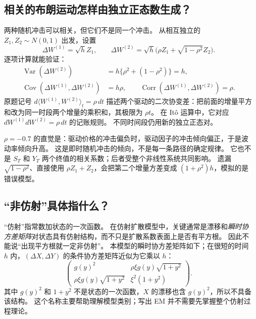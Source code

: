 \documentclass[11pt,a4paper,fontset=none]{ctexart}
\numberwithin{equation}{section}
\DeclareMathOperator{\Var}{Var}
\DeclareMathOperator{\Cov}{Cov}
\begin{document}
\subsection{相关的布朗运动怎样由独立正态数生成？}
两种随机冲击可以相关，但它们不是同一个冲击。
从相互独立的 $Z_1,Z_2\sim N(0,1)$ 出发，设置
\begin{equation}\label{eq:na-correlated}
 \Delta W^{(1)}=\sqrt h Z_1,\qquad
 \Delta W^{(2)}=\sqrt h\bigl(\rho Z_1+\sqrt{1-\rho^2}Z_2\bigr).
\end{equation}
逐项计算就能验证：
\begin{align}
 \Var(\Delta W^{(2)})&=h\{\rho^2+(1-\rho^2)\}=h,\label{eq:na-driver-var}\\
 \Cov(\Delta W^{(1)},\Delta W^{(2)})&=h\rho,\qquad
 \operatorname{Corr}(\Delta W^{(1)},\Delta W^{(2)})=\rho.\label{eq:na-driver-cov}
\end{align}
原题记号 $d\langle W^{(1)},W^{(2)}\rangle_t=\rho\,dt$ 描述两个驱动的二次协变差：把前面的增量平方和改为同一时段两个增量的乘积和，其极限为 $\rho t$。
在 Itô 运算中，它对应 $dW^{(1)}dW^{(2)}=\rho\,dt$ 的记账规则。
不同时间段仍用新的独立正态对。

$\rho=-0.7$ 的直觉是：驱动价格的冲击偏负时，驱动因子的冲击倾向偏正，于是波动率倾向升高。
这是即时随机冲击的倾向，不是每一条路径的确定规律。
它也不是 $S_T$ 和 $Y_T$ 两个终值的相关系数；后者受整个非线性系统共同影响。
遗漏 $\sqrt{1-\rho^2}$、直接使用 $\rho Z_1+Z_2$，会把第二个增量方差变成 $(1+\rho^2)h$，模拟的是错误模型。

\subsection{“非仿射”具体指什么？}
“仿射”指常数加状态的一次函数。
在仿射扩散模型中，关键通常是漂移和\emph{瞬时协方差矩阵}对状态具有仿射结构，而不只是扩散系数表面上是否有平方根。
因此不能说“出现平方根就一定非仿射”。
本模型的瞬时协方差矩阵如下；在很短的时间 $h$ 内，$(\Delta X,\Delta Y)$ 的条件协方差矩阵近似为它乘以 $h$：
\begin{equation}\label{eq:na-cov-matrix}
 \begin{pmatrix}
  g(y)^2 & \rho\xi g(y)\sqrt{1+y^2}\\
  \rho\xi g(y)\sqrt{1+y^2} & \xi^2(1+y^2)
 \end{pmatrix}.
\end{equation}
其中 $g(y)^2$ 和 $1+y^2$ 不是状态的一次函数，$X$ 的漂移也含 $g(y)^2$，所以不具备该结构。
这个名称主要帮助理解模型类别；写出 EM 并不需要先掌握整个仿射过程理论。
\end{document}
